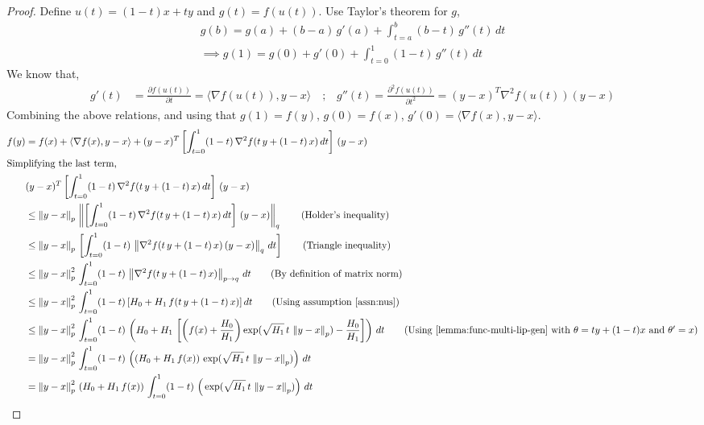 \documentclass{article}
\newcommand{\normsq}[1]{\left\|#1 \right\|^{2}}
\newcommand{\norm}[1]{\left\|#1 \right\|}
\begin{document}
\begin{proof}
Define $u(t) = (1-t) x + t y$ and $g(t) = f(u(t))$. Use Taylor's theorem for $g$,
\begin{align*}
g(b) = g(a) + (b - a) \, g'(a) + \int_{t = a}^{b} (b - t) \, g''(t) \, dt \\
\implies g(1) = g(0) + g'(0) + \int_{t = 0}^{1} (1 - t) \, g''(t) \, dt \tag{Substituting $a = 0$ and $b = 1$} 
\end{align*}
We know that, 
\begin{align*}
g'(t) &= \frac{\partial f(u(t))}{\partial t} = \langle \nabla f(u(t)), y - x \rangle \quad \text{;} \quad g''(t) = \frac{\partial^2 f(u(t))}{\partial t^2} = (y - x)^T \nabla^2 f(u(t))  (y - x)
\end{align*}
Combining the above relations, and using that $g(1) = f(y)$, $g(0) = f(x)$, $g'(0)  = \langle \nabla f(x), y - x \rangle$. 
\begin{align*}
f(y) &= f(x) + \langle \nabla f(x), y - x \rangle + (y-x)^T \left[\int_{t = 0}^{1} (1-t) \, \nabla^2 f(t \, y + (1-t) \, x) \, dt \right]\, (y-x) \\
\intertext{Simplifying the last term,}
& (y-x)^T \left[\int_{t = 0}^{1} (1-t) \, \nabla^2 f(t \, y + (1-t) \, x) \, dt \right]\, (y-x) \\
&\leq \norm{y - x}_p \, \norm{\left[\int_{t = 0}^{1} (1-t) \, \nabla^2 f(t \, y + (1-t) \, x) \, dt \right]\, (y-x)}_{q} \tag{Holder's inequality} \\
& \leq \norm{y - x}_p \, \left[\int_{t = 0}^{1} (1-t) \, \norm{\nabla^2 f(t \, y + (1-t) \, x) \, (y-x)}_{q} \, dt \right] \tag{Triangle inequality} \\
& \leq \normsq{y - x}_p \,  \int_{t = 0}^{1} (1-t) \, \norm{\nabla^2 f(t \, y + (1-t) \, x)}_{p \to q} \, dt \tag{By definition of matrix norm} \\
& \leq \normsq{y - x}_p \,  \int_{t = 0}^{1} (1-t) \, [H_0 + H_1 \, f(t \, y + (1-t) \, x)] \, dt \tag{Using assumption \ref{assn:nus}} \\
& \leq \normsq{y - x}_p \,  \int_{t = 0}^{1} (1-t) \, \left(H_0 + H_1 \, \left[ \left(f(x) + \frac{H_0}{H_1} \right) \exp(\sqrt{H_1} \, t \, \norm{y - x}_p)  - \frac{H_0}{H_1} \right] \right)\, dt \tag{Using~\cref{lemma:func-multi-lip-gen} with $\theta = ty + (1-t)x$ and $\theta' = x$} \\
& = \normsq{y - x}_p \,  \int_{t = 0}^{1} (1-t) \, \left((H_0 + H_1 \, f(x)) \, \exp(\sqrt{H_1} \, t \, \norm{y - x}_p)  \right)\, dt \\
& = \normsq{y - x}_p \, (H_0 + H_1 \, f(x))\, \int_{t = 0}^{1} (1-t) \, \left( \, \exp(\sqrt{H_1} \, t \, \norm{y - x}_p)  \right)\, dt \\

\end{align*}
\end{proof}
\end{document}
